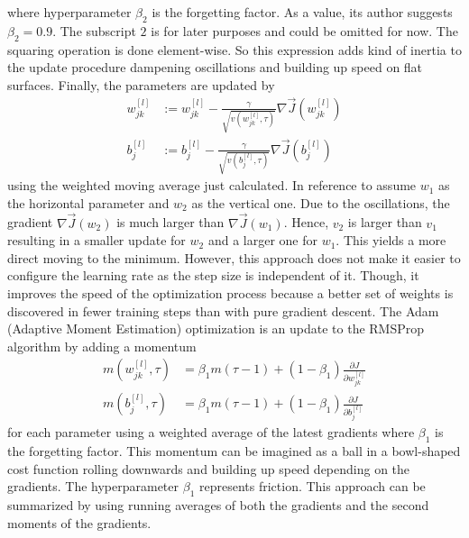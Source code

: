 where hyperparameter $\beta_2$ is the forgetting factor.
As a value, its author suggests $\beta_2 = 0.9$.
The subscript $2$ is for later purposes and could be omitted for now.
The squaring operation is done element-wise.
So this expression adds kind of inertia to the update procedure dampening oscillations and building up speed on flat surfaces.
Finally, the parameters are updated by
\begin{subequations}
	\begin{align}
		w^{[l]}_{jk} &:= w^{[l]}_{jk} - \frac{\gamma}{\sqrt{v(w^{[l]}_{jk}, \tau)}} \nabla \vec{J}(w^{[l]}_{jk}) \\
		b^{[l]}_{j} &:= b^{[l]}_{j} - \frac{\gamma}{\sqrt{v(b^{[l]}_{j}, \tau)}} \nabla \vec{J}(b^{[l]}_{j})
	\end{align}
\end{subequations}
using the weighted moving average just calculated.
In reference to  assume $w_1$ as the horizontal parameter and $w_2$ as the vertical one.
Due to the oscillations, the gradient $\nabla \vec{J}(w_2)$ is much larger than $\nabla \vec{J}(w_1)$.
Hence, $v_2$ is larger than $v_1$ resulting in a smaller update for $w_2$ and a larger one for $w_1$.
This yields a more direct moving to the minimum.
However, this approach does not make it easier to configure the learning rate as the step size is independent of it.
Though, it improves the speed of the optimization process because a better set of weights is discovered in fewer training steps than with pure gradient descent.
The Adam (Adaptive Moment Estimation) optimization is an update to the RMSProp algorithm by adding a momentum
\begin{subequations}
	\label{eq:adam-first-momentum}
	\begin{align}
		m(w^{[l]}_{jk},\tau) &= \beta_1 m(\tau -1) + (1- \beta_1) \frac{\partial J}{\partial w^{[l]}_{jk}} \\
		m(b^{[l]}_{j},\tau) &= \beta_1 m(\tau -1) + (1- \beta_1) \frac{\partial J}{\partial b^{[l]}_{j}}
	\end{align}
\end{subequations}
for each parameter using a weighted average of the latest gradients\cite{DBLP:journals/corr/KingmaB14} where $\beta_1$ is the forgetting factor.
This momentum can be imagined as a ball in a bowl-shaped cost function rolling downwards and building up speed depending on the gradients.
The hyperparameter $\beta_1$ represents friction.
This approach can be summarized by using running averages of both the gradients and the second moments of the gradients.
